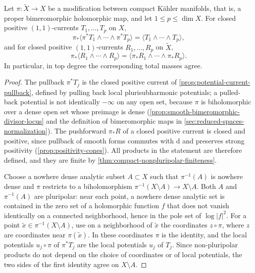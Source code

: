 \begin{proposition}\label{prop:nonpluripolar-modification-pushforward}
Let $\pi\colon\widetilde X\to X$ be a modification between compact K\"ahler manifolds, that is, a proper bimeromorphic holomorphic map, and let $1\leq p\leq\dim X$. For closed positive $(1,1)$-currents $T_1,\ldots,T_p$ on $X$,
\[
 \pi_*\langle\pi^*T_1\wedge\cdots\wedge\pi^*T_p\rangle
                  =\langle T_1\wedge\cdots\wedge T_p\rangle,
\]
and for closed positive $(1,1)$-currents $R_1,\ldots,R_p$ on $\widetilde X$,
\[
 \pi_*\langle R_1\wedge\cdots\wedge R_p\rangle
                   =\langle\pi_*R_1\wedge\cdots\wedge\pi_*R_p\rangle.
\]
In particular, in top degree the corresponding total masses agree.
\end{proposition}
\begin{proof}
The pullback $\pi^*T_j$ is the closed positive current of \cref{prop:potential-current-pullback}, defined by pulling back local plurisubharmonic potentials; a pulled-back potential is not identically $-\infty$ on any open set, because $\pi$ is biholomorphic over a dense open set whose preimage is dense (\cref{prop:smooth-bimeromorphic-divisor-locus} and the definition of bimeromorphic maps in \cref{sec:reduced-spaces-normalization}). The pushforward $\pi_*R$ of a closed positive current is closed and positive, since pullback of smooth forms commutes with $\mathrm d$ and preserves strong positivity (\cref{prop:positivity-cones}). All products in the statement are therefore defined, and they are finite by \cref{thm:compact-nonpluripolar-finiteness}.

Choose a nowhere dense analytic subset $A\subset X$ such that $\pi^{-1}(A)$ is nowhere dense and $\pi$ restricts to a biholomorphism $\pi^{-1}(X\setminus A)\to X\setminus A$. Both $A$ and $\pi^{-1}(A)$ are pluripolar: near each point, a nowhere dense analytic set is contained in the zero set of a holomorphic function $f$ that does not vanish identically on a connected neighborhood, hence in the pole set of $\log|f|^2$. For a point $\widetilde x\in\pi^{-1}(X\setminus A)$, use on a neighborhood of $\widetilde x$ the coordinates $z\circ\pi$, where $z$ are coordinates near $\pi(\widetilde x)$. In these coordinates $\pi$ is the identity, and the local potentials $u_j\circ\pi$ of $\pi^*T_j$ are the local potentials $u_j$ of $T_j$. Since non-pluripolar products do not depend on the choice of coordinates or of local potentials, the two sides of the first identity agree on $X\setminus A$.


\end{proof}
